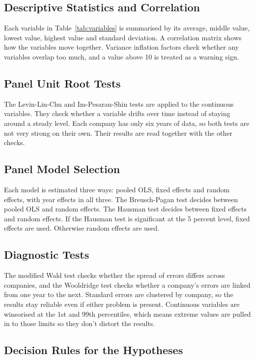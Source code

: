 \subsection{Descriptive Statistics and Correlation}

Each variable in Table~\ref{tab:variables} is summarised by its average, middle value, lowest value, highest value and standard deviation. A correlation matrix shows how the variables move together. Variance inflation factors check whether any variables overlap too much, and a value above 10 is treated as a warning sign.

\subsection{Panel Unit Root Tests}

The Levin-Lin-Chu and Im-Pesaran-Shin tests are applied to the continuous variables. They check whether a variable drifts over time instead of staying around a steady level. Each company has only six years of data, so both tests are not very strong on their own. Their results are read together with the other checks.

\subsection{Panel Model Selection}

Each model is estimated three ways: pooled OLS, fixed effects and random effects, with year effects in all three. The Breusch-Pagan test decides between pooled OLS and random effects. The Hausman test decides between fixed effects and random effects. If the Hausman test is significant at the 5 percent level, fixed effects are used. Otherwise random effects are used.

\subsection{Diagnostic Tests}

The modified Wald test checks whether the spread of errors differs across companies, and the Wooldridge test checks whether a company's errors are linked from one year to the next. Standard errors are clustered by company, so the results stay reliable even if either problem is present. Continuous variables are winsorised at the 1st and 99th percentiles, which means extreme values are pulled in to those limits so they don't distort the results.

\subsection{Decision Rules for the Hypotheses}


